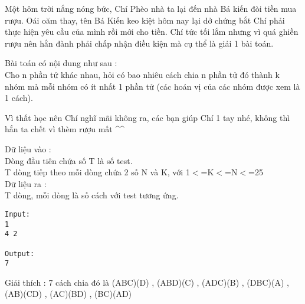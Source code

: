 



   Một hôm trời nắng nóng bức, Chí Phèo nhà ta lại đến nhà Bá kiến đòi tiền mua rượu. Oái oăm thay, tên Bá Kiến keo kiệt hôm nay lại dở chứng bắt Chí phải thực hiện yêu cầu của mình rồi mới cho tiền. Chí tức tối lắm nhưng vì quá ghiền rượu nên hắn đành phải chấp nhận điều kiện mà cụ thể là giải 1 bài toán.  

   Bài toán có nội dung như sau :   
\\   Cho n phần tử khác nhau, hỏi có bao nhiêu cách chia n phần tử đó thành k nhóm mà mỗi nhóm có ít nhất 1 phần tử (các hoán vị của các nhóm được xem là 1 cách).  

   Vì thất học nên Chí nghĩ mãi không ra, các bạn giúp Chí 1 tay nhé, không thì hắn ta chết vì thèm rượu mất \textasciicircum\textasciicircum  

       Dữ liệu vào :      
\\   Dòng đầu tiên chứa số T là số test.   
\\   T dòng tiếp theo mỗi dòng chứa 2 số N và K, với 1$<$=K$<$=N$<$=25   
\\       Dữ liệu ra :      
\\   T dòng, mỗi dòng là số cách với test tương ứng.  
\begin{verbatim}
Input:
1
4 2

Output:
7
\end{verbatim}

   Giải thích : 7 cách chia đó là (ABC)(D) , (ABD)(C) , (ADC)(B) , (DBC)(A) , (AB)(CD) , (AC)(BD) , (BC)(AD)  
